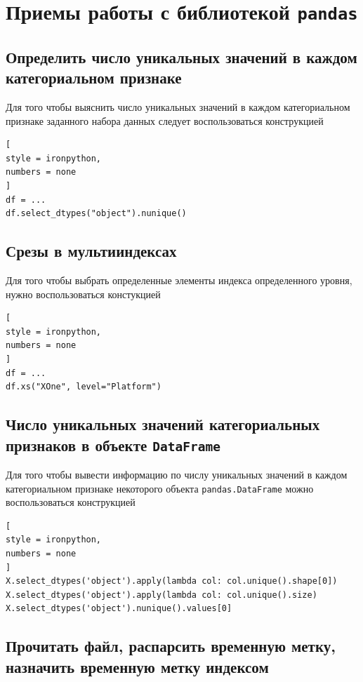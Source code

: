 \documentclass[%
	11pt,
	a4paper,
	utf8,
		]{article}
\begin{document}
\section{Приемы работы с библиотекой \texttt{pandas}}

\subsection{Определить число уникальных значений в каждом категориальном признаке}

Для того чтобы выяснить число уникальных значений в каждом категориальном признаке заданного набора данных следует воспользоваться конструкцией
\begin{lstlisting}[
style = ironpython,
numbers = none	
]
df = ...
df.select_dtypes("object").nunique()
\end{lstlisting}

\subsection{Срезы в мультииндексах}

Для того чтобы выбрать определенные элементы индекса определенного уровня, нужно воспользоваться констукцией
\begin{lstlisting}[
style = ironpython,
numbers = none	
]
df = ...
df.xs("XOne", level="Platform")
\end{lstlisting}



\subsection{Число уникальных значений категориальных признаков в объекте \texttt{DataFrame}}

Для того чтобы вывести информацию по числу уникальных значений в каждом категориальном признаке некоторого объекта \texttt{pandas.DataFrame} можно воспользоваться конструкцией

\begin{lstlisting}[
style = ironpython,
numbers = none
]
X.select_dtypes('object').apply(lambda col: col.unique().shape[0])
X.select_dtypes('object').apply(lambda col: col.unique().size)
X.select_dtypes('object').nunique().values[0]
\end{lstlisting}

\subsection{Прочитать файл, распарсить временную метку, назначить временную метку индексом}
\end{document}
